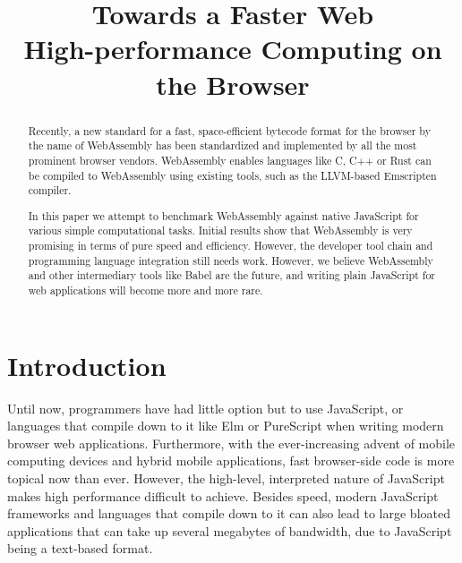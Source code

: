 \documentclass[conference]{IEEEtran}
\begin{document}
\title{Towards a Faster Web\\High-performance Computing on the Browser}

\author{
\and
{}
\and
{}
}
\maketitle

\begin{abstract}
Recently, a new standard for a fast, space-efficient bytecode format for the
  browser by the name of WebAssembly has been standardized and implemented by
  all the most prominent browser vendors. WebAssembly enables languages like C,
  C++ or Rust can be compiled to WebAssembly using existing tools, such as the
  LLVM-based Emscripten compiler.

  In this paper we attempt to benchmark WebAssembly against native JavaScript
  for various simple computational tasks. Initial results show that WebAssembly
  is very promising in terms of pure speed and efficiency. However, the
  developer tool chain and programming language integration still needs work.
  However, we believe WebAssembly and other intermediary tools like Babel are
  the future, and writing plain JavaScript for web applications will become
  more and more rare.
\end{abstract}

\section{Introduction}
Until now, programmers have had little option but to use JavaScript, or
languages that compile down to it like Elm or PureScript when writing modern
browser web applications. Furthermore, with the ever-increasing advent of mobile
computing devices and hybrid mobile applications, fast browser-side code is
more topical now than ever. However, the high-level, interpreted nature of
JavaScript makes high performance difficult to achieve. Besides speed, modern
JavaScript frameworks and languages that compile down to it can also lead to
large bloated applications that can take up several megabytes of bandwidth, due
to JavaScript being a text-based format.
\end{document}
